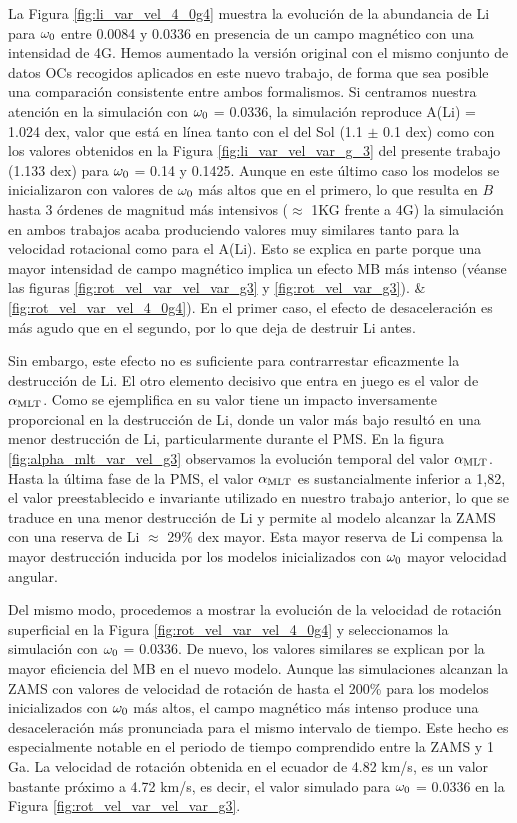 La Figura \ref{fig:li_var_vel_4_0g4} muestra la evolución de la abundancia de Li para $\omega_{\mathrm{0}}$ entre 0.0084 y 0.0336 en presencia de un campo magnético con una intensidad de 4G. Hemos aumentado la versión original con el mismo conjunto de datos OCs recogidos aplicados en este nuevo trabajo, de forma que sea posible una comparación consistente entre ambos formalismos. Si centramos nuestra atención en la simulación con $\omega_{\mathrm{0}}$ = 0.0336, la simulación reproduce A(Li) = 1.024 dex, valor que está en línea tanto con el del Sol (1.1 $\pm$ 0.1 dex) como con los valores obtenidos en la Figura \ref{fig:li_var_vel_var_g_3} del presente trabajo (1.133 dex) para $\omega_{\mathrm{0}}$ = 0.14 y 0.1425. Aunque en este último caso los modelos se inicializaron con valores de $\omega_{\mathrm{0}}$ más altos que en el primero, lo que resulta en $B$ hasta 3 órdenes de magnitud más intensivos ($\approx$ 1KG frente a 4G) la simulación en ambos trabajos acaba produciendo valores muy similares tanto para la velocidad rotacional como para el A(Li). Esto se explica en parte porque una mayor intensidad de campo magnético implica un efecto MB más intenso (véanse las figuras \ref{fig:rot_vel_var_vel_var_g3} y \ref{fig:rot_vel_var_g3}). \& \ref{fig:rot_vel_var_vel_4_0g4}). En el primer caso, el efecto de desaceleración es más agudo que en el segundo, por lo que deja de destruir Li antes.\par

Sin embargo, este efecto no es suficiente para contrarrestar eficazmente la destrucción de Li. El otro elemento decisivo que entra en juego es el valor de $\alpha_{\mathrm{MLT}}$. Como se ejemplifica en \cite{Caballero2020} su valor tiene un impacto inversamente proporcional en la destrucción de Li, donde un valor más bajo resultó en una menor destrucción de Li, particularmente durante el PMS. En la figura \ref{fig:alpha_mlt_var_vel_g3} observamos la evolución temporal del valor $\alpha_{\mathrm{MLT}}$. Hasta la última fase de la PMS, el valor $\alpha_{\mathrm{MLT}}$ es sustancialmente inferior a 1,82, el valor preestablecido e invariante utilizado en nuestro trabajo anterior, lo que se traduce en una menor destrucción de Li y permite al modelo alcanzar la ZAMS con una reserva de Li $\approx$ 29\% dex mayor. Esta mayor reserva de Li compensa la mayor destrucción inducida por los modelos inicializados con $\omega_{\mathrm{0}}$ mayor velocidad angular.\par

Del mismo modo, procedemos a mostrar la evolución de la velocidad de rotación superficial en la Figura \ref{fig:rot_vel_var_vel_4_0g4} y seleccionamos la simulación con $\omega_{\mathrm{0}}$ = 0.0336. De nuevo, los valores similares se explican por la mayor eficiencia del MB en el nuevo modelo. Aunque las simulaciones alcanzan la ZAMS con valores de velocidad de rotación de hasta el 200\% para los modelos inicializados con $\omega_{\mathrm{0}}$ más altos, el campo magnético más intenso produce una desaceleración más pronunciada para el mismo intervalo de tiempo. Este hecho es especialmente notable en el periodo de tiempo comprendido entre la ZAMS y 1 Ga. La velocidad de rotación obtenida en el ecuador de 4.82 km/s, es un valor bastante próximo a 4.72 km/s, es decir, el valor simulado para $\omega_{\mathrm{0}}$ = 0.0336 en la Figura \ref{fig:rot_vel_var_vel_var_g3}.\par

